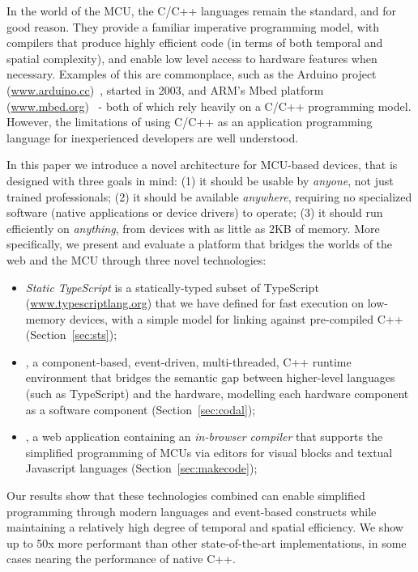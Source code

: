 In the world of the MCU, the C/C++ languages remain the standard, and for good reason. 
They provide a familiar imperative programming model, with compilers that produce highly efficient code (in terms of both 
temporal and spatial complexity), and enable low level access to hardware features when necessary. Examples
of this are commonplace, such as the Arduino project (\url{www.arduino.cc})~\cite{buildingArduino2014},
started in 2003, and ARM's Mbed platform (\url{www.mbed.org})~\cite{ARMmbed} - both of which rely heavily on
a C/C++ programming model. However, the limitations of using C/C++ as an application programming language for 
inexperienced developers are well understood. 

In this paper we introduce a novel architecture for MCU-based devices,
that is designed with three goals in mind: 
(1) it should be usable by \emph{anyone}, not just trained professionals; 
(2) it should be available \emph{anywhere}, requiring no specialized software (native applications
or device drivers) to operate;
(3) it should run efficiently on \emph{anything}, from devices with as little as 2KB of memory.
More specifically, we present and evaluate a platform that bridges the worlds of the web and the 
MCU through three novel technologies:

\begin{itemize}
\item \emph{Static TypeScript} is a statically-typed subset of TypeScript
(\url{www.typescriptlang.org}) that we have defined for fast execution on low-memory devices,
with a simple model for linking against pre-compiled C++ (Section~\ref{sec:sts});

\item \emph{\CO}, a component-based, event-driven, multi-threaded, C++ runtime environment
that bridges the semantic gap between higher-level languages (such as TypeScript) and the hardware,
modelling each hardware component as a software component (Section~\ref{sec:codal});

\item \emph{\MCN}, a web application containing an \emph{in-browser compiler} that supports the 
simplified programming of MCUs via editors for visual blocks and textual Javascript languages 
(Section~\ref{sec:makecode});
\end{itemize}

Our results show that these technologies combined can enable simplified programming through modern
languages and event-based constructs while maintaining a relatively high degree of temporal and spatial efficiency. 
We show up to 50x more performant than other state-of-the-art implementations, 
in some cases nearing the performance of native C++. 


